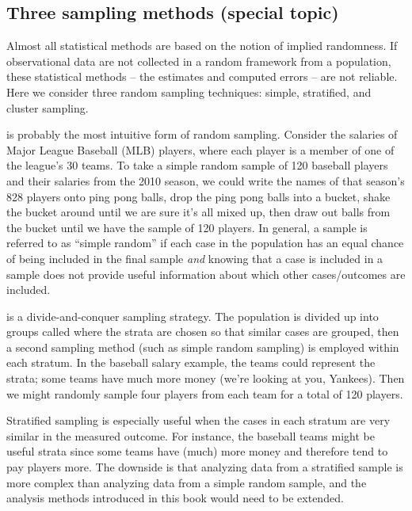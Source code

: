 \subsection{Three sampling methods (special topic)}
\label{threeSamplingMethods}

Almost all statistical methods are based on the notion of implied randomness. If observational data are not collected in a random framework from a population, these statistical methods -- the estimates and computed errors -- are not reliable. Here we consider three random sampling techniques: simple, stratified, and cluster sampling.

 is probably the most intuitive form of random sampling. Consider the salaries of Major League Baseball (MLB) players, where each player is a member of one of the league's 30 teams. To take a simple random sample of 120 baseball players and their salaries from the 2010 season, we could write the names of that season's 828 players onto ping pong balls, drop the ping pong balls into a bucket, shake the bucket around until we are sure it's all mixed up, then draw out balls from the bucket until we have the sample of 120 players. In general, a sample is referred to as ``simple random'' if each case in the population has an equal chance of being included in the final sample \emph{and} knowing that a case is included in a sample does not provide useful information about which other cases/outcomes are included.

 is a divide-and-conquer sampling strategy. The population is divided up into groups called   where the strata are chosen so that similar cases are grouped, then a second sampling method (such as simple random sampling) is employed within each stratum. In the baseball salary example, the teams could represent the strata; some teams have much more money (we're looking at you, Yankees). Then we might randomly sample four players from each team for a total of 120 players.

Stratified sampling is especially useful when the cases in each stratum are very similar in the measured outcome. For instance, the baseball teams might be useful strata since some teams have (much) more money and therefore tend to pay players more. The downside is that analyzing data from a stratified sample is more complex than analyzing data from a simple random sample, and the analysis methods introduced in this book would need to be extended.

